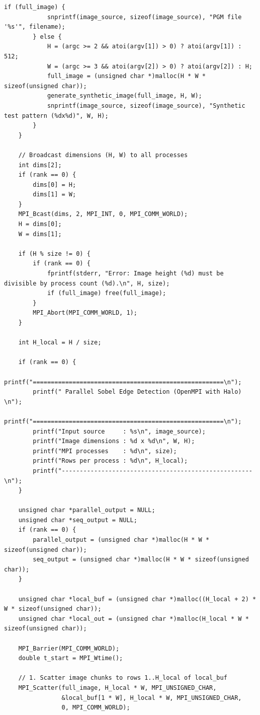 \documentclass[12pt]{article}
\begin{document}
\begin{lstlisting}[style=code]
        if (full_image) {
            snprintf(image_source, sizeof(image_source), "PGM file '%s'", filename);
        } else {
            H = (argc >= 2 && atoi(argv[1]) > 0) ? atoi(argv[1]) : 512;
            W = (argc >= 3 && atoi(argv[2]) > 0) ? atoi(argv[2]) : H;
            full_image = (unsigned char *)malloc(H * W * sizeof(unsigned char));
            generate_synthetic_image(full_image, H, W);
            snprintf(image_source, sizeof(image_source), "Synthetic test pattern (%dx%d)", W, H);
        }
    }

    // Broadcast dimensions (H, W) to all processes
    int dims[2];
    if (rank == 0) {
        dims[0] = H;
        dims[1] = W;
    }
    MPI_Bcast(dims, 2, MPI_INT, 0, MPI_COMM_WORLD);
    H = dims[0];
    W = dims[1];

    if (H % size != 0) {
        if (rank == 0) {
            fprintf(stderr, "Error: Image height (%d) must be divisible by process count (%d).\n", H, size);
            if (full_image) free(full_image);
        }
        MPI_Abort(MPI_COMM_WORLD, 1);
    }

    int H_local = H / size;

    if (rank == 0) {
        printf("=====================================================\n");
        printf(" Parallel Sobel Edge Detection (OpenMPI with Halo)  \n");
        printf("=====================================================\n");
        printf("Input source     : %s\n", image_source);
        printf("Image dimensions : %d x %d\n", W, H);
        printf("MPI processes    : %d\n", size);
        printf("Rows per process : %d\n", H_local);
        printf("-----------------------------------------------------\n");
    }

    unsigned char *parallel_output = NULL;
    unsigned char *seq_output = NULL;
    if (rank == 0) {
        parallel_output = (unsigned char *)malloc(H * W * sizeof(unsigned char));
        seq_output = (unsigned char *)malloc(H * W * sizeof(unsigned char));
    }

    unsigned char *local_buf = (unsigned char *)malloc((H_local + 2) * W * sizeof(unsigned char));
    unsigned char *local_out = (unsigned char *)malloc(H_local * W * sizeof(unsigned char));

    MPI_Barrier(MPI_COMM_WORLD);
    double t_start = MPI_Wtime();

    // 1. Scatter image chunks to rows 1..H_local of local_buf
    MPI_Scatter(full_image, H_local * W, MPI_UNSIGNED_CHAR,
                &local_buf[1 * W], H_local * W, MPI_UNSIGNED_CHAR,
                0, MPI_COMM_WORLD);


\end{lstlisting}
\end{document}
